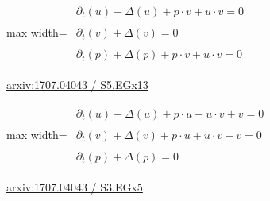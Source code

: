 \documentclass[UTF8,10pt,a4paper,fontset=mac]{ctexart}
\begin{document}
\begin{minipage}{\linewidth}\begin{center}\begin{adjustbox}{max width=\linewidth}$\displaystyle\begin{gathered}\begin{gathered}\partial_{t}(u)+\Delta(u)+p\cdot v+u\cdot v=0\end{gathered}\\[5pt]\begin{gathered}\partial_{t}(v)+\Delta(v)=0\end{gathered}\\[5pt]\begin{gathered}\partial_{t}(p)+\Delta(p)+p\cdot v+u\cdot v=0\end{gathered}\end{gathered}$\end{adjustbox}\end{center}{\small\href{https://arxiv.org/html/1707.04043#S5.EGx13}{arxiv:1707.04043 / S5.EGx13}}\par\end{minipage}\par\vspace{6mm}

\begin{minipage}{\linewidth}\begin{center}\begin{adjustbox}{max width=\linewidth}$\displaystyle\begin{gathered}\begin{gathered}\partial_{t}(u)+\Delta(u)+p\cdot u+u\cdot v+v=0\end{gathered}\\[5pt]\begin{gathered}\partial_{t}(v)+\Delta(v)+p\cdot u+u\cdot v+v=0\end{gathered}\\[5pt]\begin{gathered}\partial_{t}(p)+\Delta(p)=0\end{gathered}\end{gathered}$\end{adjustbox}\end{center}{\small\href{https://arxiv.org/html/1707.04043#S3.EGx5}{arxiv:1707.04043 / S3.EGx5}}\par\end{minipage}\par\vspace{6mm}
\end{document}

